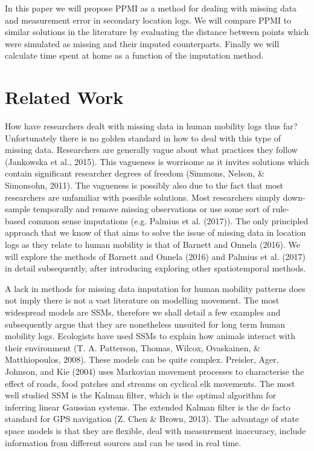 \documentclass[man]{apa6}
\theoremstyle{definition}
\theoremstyle{definition}
\theoremstyle{definition}
\theoremstyle{remark}
\begin{document}
In this paper we will propose PPMI as a method for dealing with missing
data and measurement error in secondary location logs. We will compare
PPMI to similar solutions in the literature by evaluating the distance
between points which were simulated as missing and their imputed
counterparts. Finally we will calculate time spent at home as a function
of the imputation method.

\section{Related Work}\label{related-work}

How have researchers dealt with missing data in human mobility logs thus
far? Unfortunately there is no golden standard in how to deal with this
type of missing data. Researchers are generally vague about what
practices they follow (Jankowska et al., 2015). This vagueness is
worrisome as it invites solutions which contain significant researcher
degrees of freedom (Simmons, Nelson, \& Simonsohn, 2011). The vagueness
is possibly also due to the fact that most researchers are unfamiliar
with possible solutions. Most researchers simply down-sample temporally
and remove missing observations or use some sort of rule-based common
sense imputations (e.g. Palmius et al. (2017)). The only principled
approach that we know of that aims to solve the issue of missing data in
location logs as they relate to human mobility is that of Barnett and
Onnela (2016). We will explore the methods of Barnett and Onnela (2016)
and Palmius et al. (2017) in detail subsequently, after introducing
exploring other spatiotemporal methods.

A lack in methods for missing data imputation for human mobility
patterns does not imply there is not a vast literature on modelling
movement. The most widespread models are SSMs, therefore we shall detail
a few examples and subsequently argue that they are nonetheless unsuited
for long term human mobility logs. Ecologists have used SSMs to explain
how animals interact with their environment (T. A. Patterson, Thomas,
Wilcox, Ovaskainen, \& Matthiopoulos, 2008). These models can be quite
complex. Preisler, Ager, Johnson, and Kie (2004) uses Markovian movement
processes to characterise the effect of roads, food patches and streams
on cyclical elk movements. The most well studied SSM is the Kalman
filter, which is the optimal algorithm for inferring linear Gaussian
systems. The extended Kalman filter is the de facto standard for GPS
navigation (Z. Chen \& Brown, 2013). The advantage of state space models
is that they are flexible, deal with measurement inaccuracy, include
information from different sources and can be used in real time.
\end{document}
